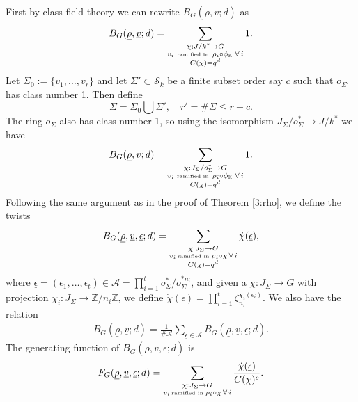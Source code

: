 \documentclass[12pt]{amsart}
\theoremstyle{plain}
\begin{document}
First by class field theory we can rewrite ${B_{G}({\underline{{\rho}}},{\underline{{v}}};d)}$ as
\[{B_{G}({\underline{{\rho}}},{\underline{{v}}};d)}=\sum_{\substack{\chi:J/k^* \to G\\
v_i \,\,\mbox{\tiny ramified in } \, \rho_i \circ {\phi_{{\mathbb K}}} \,\, \forall \, i\\
C(\chi)=q^d}} 1. \]
Let $\Sigma_0:=\{v_1,\ldots,v_r\}$ and let $\Sigma' \subset {\mathcal{S}_k}$ be a finite subset order say $c$ such that $o_{\Sigma'}$ has class number 1. Then define
\[\Sigma=\Sigma_0 \bigcup \Sigma', \quad r'=\#\Sigma \le r+c. \]
The ring $o_{\Sigma}$ also has class number 1, so using the isomorphism $J_{\Sigma}/o_{\Sigma}^* \to J/k^*$ we have
\[{B_{G}({\underline{{\rho}}},{\underline{{v}}};d)}=\sum_{\substack{\chi:J_{\Sigma}/o_{\Sigma}^* \to G\\
v_i \,\,\mbox{\tiny ramified in } \, \rho_i \circ {\phi_{{\mathbb K}}} \,\, \forall \, i\\
C(\chi)=q^d}} 1. \]
Following the same argument as in the proof of Theorem \ref{3:rho}, we define the twists
\begin{eqnarray*} \label{4:twi} {B_{G}({\underline{{\rho}}},{\underline{{v}}},{\underline{{\epsilon}}};d)}=
\sum_{\substack{\chi:J_{\Sigma} \to G \\
v_i \, \mbox{\tiny ramified in } \rho_i \circ \chi \, \forall \, i\\
C(\chi)=q^d}} \dot{\chi}({\underline{{\epsilon}}}), \end{eqnarray*}
where ${\underline{{\epsilon}}}=(\epsilon_1,\ldots,\epsilon_t) \in {\mathcal{A}}=\prod_{i=1}^t o_{\Sigma}^*/o_{\Sigma}^{*n_i}$, and given a $\chi: J_{\Sigma} \to G$ with projection $\chi_i: J_{\Sigma} \to {{\mathbb Z}}/n_i{{\mathbb Z}}$, we define $\dot{\chi}({\underline{{\epsilon}}})=\prod_{i=1}^t
\zeta_{n_i}^{\chi_i(\epsilon_i)}$. We also have the relation \begin{eqnarray} \label{4:epf} {B_{G}({\underline{{\rho}}},{\underline{{v}}};d)}=\frac{1}{\#{\mathcal{A}}}
\sum_{{\underline{{\epsilon}}} \in {\mathcal{A}}}{B_{G}({\underline{{\rho}}},{\underline{{v}}},{\underline{{\epsilon}}};d)}. \end{eqnarray}
The generating function of ${B_{G}({\underline{{\rho}}},{\underline{{v}}},{\underline{{\epsilon}}};d)}$ is
\[{F_{G}({\underline{{\rho}}},{\underline{{v}}},{\underline{{\epsilon}}};d)}=\sum_{\substack{\chi:J_{\Sigma} \to G \\
v_i \, \mbox{\tiny ramified in } \rho_i \circ \chi \, \forall \, i}} \frac{\dot{\chi}({\underline{{\epsilon}}})}{C(\chi)^s}. \]
\end{document}
